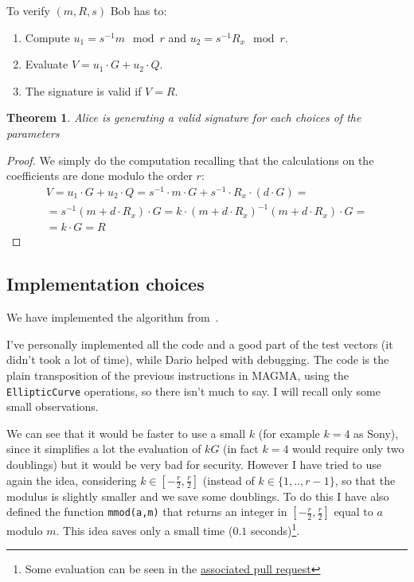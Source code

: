 \documentclass{article}
\theoremstyle{plain}
\newtheorem{teo}{Theorem}[section]
\theoremstyle{remark}
\theoremstyle{definition}
\begin{document}
To verify $(m,R,s)$ Bob has to:
\begin{enumerate}
	\item Compute $u_1 = s^{-1} m \mod r$ and $u_2 = s^{-1} R_x  \mod r$.
	\item Evaluate $V = u_1 \cdot G + u_2 \cdot Q$. 
	\item The signature is valid if $V = R$.
\end{enumerate}

\begin{teo}
	Alice is generating a valid signature for each choices of the parameters
\end{teo}
\begin{proof}
	We simply do the computation recalling that the calculations on the coefficients are done modulo the order $r$:
	\begin{multline*}
		V = u_1 \cdot G + u_2 \cdot Q = s^{-1} \cdot m \cdot G + s^{-1} \cdot R_x \cdot (d \cdot G) = \\
		= s^{-1} (m + d\cdot R_x) \cdot G = k\cdot (m + d\cdot R_x)^{-1} (m + d\cdot R_x) \cdot G = \\
		= k \cdot G = R
	\end{multline*}
\end{proof}


\subsection{Implementation choices}

We have implemented the algorithm from~\cite[Section 6.6]{washington}.

I've personally implemented all the code and a good part of the test vectors (it didn't took a lot of time), while Dario helped with debugging. The code is the plain transposition of the previous instructions in MAGMA, using the \texttt{EllipticCurve} operations, so there isn't much to say. I will recall only some small observations.

We can see that it would be faster to use a small $k$ (for example $k = 4$ as Sony), since it simplifies a lot the evaluation of $kG$ (in fact $k=4$ would require only two doublings) but it would be very bad for security. 
However I have tried to use again the idea, considering $k \in [-\frac{r}{2}, \frac{r}{2}]$ (instead of $k \in \{1,..,r-1\}$, so that the modulus is slightly smaller and we save some doublings. To do this I have also defined the function \texttt{mmod(a,m)} that returns an integer in $[-\frac{r}{2}, \frac{r}{2}]$ equal to $a$ modulo $m$. This idea saves only a small time ($0.1$ seconds)\footnote{Some evaluation can be seen in the \href{https://github.com/giacomoborin/project2_MAGMA/pull/36}{associated pull request}}.
\end{document}
